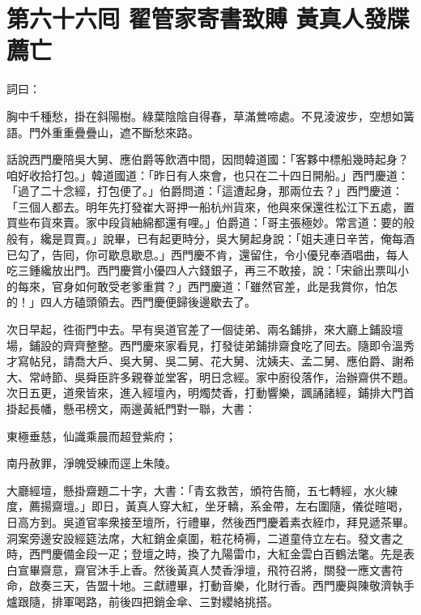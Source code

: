 
\chapter*{第六十六囘 翟管家寄書致賻 黃真人發牒薦亡}


詞曰：

\begin{myquote} 
胸中千種愁，掛在斜陽樹。綠葉陰陰自得春，草滿鶯啼處。不見淩波步，空想如簧語。門外重重疊疊山，遮不斷愁來路。

\end{myquote} 

話說西門慶陪吳大舅、應伯爵等飲酒中間，因問韓道國：「客夥中標船幾時起身？咱好收拾打包。」韓道國道：「昨日有人來會，也只在二十四日開船。」西門慶道：「過了二十念經，打包便了。」伯爵問道：「這遭起身，那兩位去？」西門慶道：「三個人都去。明年先打發崔大哥押一船杭州貨來，他與來保還徃松江下五處，置買些布貨來賣。家中段貨紬綿都還有哩。」{}伯爵道：「哥主張極妙。常言道：要的般般有，纔是買賣。」說畢，已有起更時分，吳大舅起身說：「姐夫連日辛苦，俺每酒已勾了，告囘，你可歇息歇息。」西門慶不肯，還留住，令小優兒奉酒唱曲，每人吃三鍾纔放出門。西門慶賞小優四人六錢銀子，再三不敢接，說：「宋爺出票叫小的每來，官身如何敢受老爹重賞？」西門慶道：「雖然官差，此是我賞你，怕怎的！」四人方磕頭領去。西門慶便歸後邊歇去了。

次日早起，徃衙門中去。早有吳道官差了一個徒弟、兩名鋪排，來大廳上鋪設壇場，鋪設的齊齊整整。西門慶來家看見，打發徒弟鋪排齋食吃了囘去。隨即令溫秀才寫帖兒，請喬大戶、吳大舅、吳二舅、花大舅、沈姨夫、孟二舅、應伯爵、謝希大、常峙節、吳舜臣許多親眷並堂客，明日念經。家中廚役落作，治辦齋供不題。次日五更，道衆皆來，進入經壇內，明燭焚香，打動響樂，諷誦諸經，鋪排大門首掛起長幡，懸弔榜文，兩邊黃紙門對一聯，大書：

\begin{myquote} 
東極垂慈，仙識乘晨而超登紫府；

南丹赦罪，淨魄受練而逕上朱陵。
\end{myquote} 

大廳經壇，懸掛齋題二十字，大書：「青玄救苦，頒符告簡，五七轉經，水火練度，薦揚齋壇。」即日，黃真人穿大紅，坐牙轎，系金帶，左右圍隨，儀從暄喝，日高方到。吳道官率衆接至壇所，行禮畢，然後西門慶着素衣絰巾，拜見遞茶畢。洞案旁邊安設經筵法席，大紅銷金桌圍，粧花椅褥，二道童侍立左右。發文書之時，西門慶備金段一疋；登壇之時，換了九陽雷巾，大紅金雲白百鶴法氅。先是表白宣畢齋意，齋官沐手上香。然後黃真人焚香淨壇，飛符召將，關發一應文書符命，啟奏三天，告盟十地。三獻禮畢，打動音樂，化財行香。西門慶與陳敬濟執手爐跟隨，排軍喝路，前後四把銷金傘、三對纓絡挑搭。

